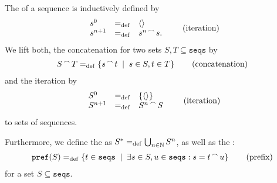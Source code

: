 \begin{definition}
The  of a sequence is inductively defined by
\begin{align}
	\begin{array}{lcl}
		s^0&=_{\mathrm{def}}&\langle\rangle \\
		s^{n+1}&=_{\mathrm{def}}&{s^n}^{\,\frown{}\,}{s}.
	\end{array}
\tag{iteration}
\end{align}
We lift both, the concatenation for two sets $S,T\subseteq\texttt{seqs}$ by
\begin{align*}\seqconc{S}{T}\define\set[s\in{}S,t\in{}T]{\seqconc{s}{t}}\tag{concatenation}\end{align*}
and the iteration by
\begin{align}
	\begin{array}{lcl}
		S^0&\define&\set{\eseq} \\
		S^{n+1}&\define&\seqconc{S^n}{S}
	\end{array}
\tag{iteration}
\end{align}
to sets of sequences.

Furthermore, we define the  as $S^*=_{\mathrm{def}}\bigcup_{n\in\mathbb N}S^n$, as well as the :
\begin{align}
\pref{S}\define\set[\exists{}s\in{}S,u\in\texttt{seqs}:s=\seqconc{t}{u}]{t\in{}\texttt{seqs}}\tag{prefix}
\end{align}
for a set $S\subseteq\texttt{seqs}$.
\end{definition}

